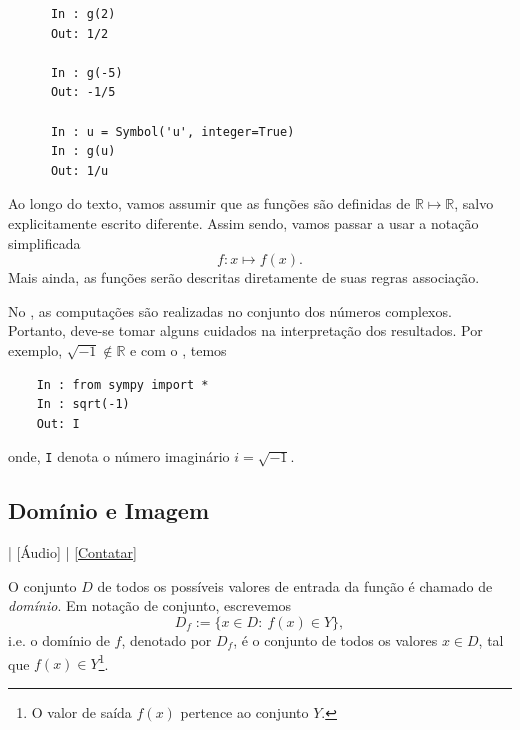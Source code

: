 \begin{ex}
\begin{enumerate}[a)]
\begin{lstlisting}
      In : g(2)
      Out: 1/2
      
      In : g(-5)
      Out: -1/5
      
      In : u = Symbol('u', integer=True)
      In : g(u)
      Out: 1/u
    \end{lstlisting}
    \fi
  \end{enumerate}
\end{ex}

\begin{obs}
  Ao longo do texto, vamos assumir que as funções são definidas de $\mathbb{R}\mapsto\mathbb{R}$, salvo explicitamente escrito diferente. Assim sendo, vamos passar a usar a notação simplificada
  \begin{equation}
    f:x\mapsto f(x).
  \end{equation}
  Mais ainda, as funções serão descritas diretamente de suas regras associação.
\end{obs}

\ifispython
\begin{obs}
  No {\sympy}, as computações são realizadas no conjunto dos números complexos. Portanto, deve-se tomar alguns cuidados na interpretação dos resultados. Por exemplo, $\sqrt{-1}\not\in\mathbb{R}$ e com o {\sympy}, temos
  \begin{lstlisting}
    In : from sympy import *
    In : sqrt(-1)
    Out: I
  \end{lstlisting}
  onde, \verb+I+ denota o número imaginário $i = \sqrt{-1}$.
\end{obs}
\fi

\subsection{Domínio e Imagem}

\begin{flushright}
  [Vídeo] | [Áudio] | \href{https://phkonzen.github.io/notas/contato.html}{[Contatar]}
\end{flushright}

O conjunto $D$ de todos os possíveis valores de entrada da função é chamado de \emph{domínio}. Em notação de conjunto, escrevemos
\begin{equation}
  D_f := \{x\in D:~f(x)\in Y\},
\end{equation}
i.e. o domínio de $f$, denotado por $D_f$, é o conjunto de todos os valores $x\in D$, tal que $f(x)\in Y$\footnote{O valor de saída $f(x)$ pertence ao conjunto $Y$.}.


